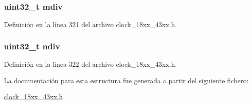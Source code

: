 \subsubsection[{\texorpdfstring{mdiv}{mdiv}}]{\setlength{\rightskip}{0pt plus 5cm}uint32\+\_\+t mdiv}\hypertarget{struct_c_g_u___u_s_b_a_u_d_i_o___p_l_l___s_e_t_u_p___t_ab8004496d39107a08ec9f804215bd2fb}{}\label{struct_c_g_u___u_s_b_a_u_d_i_o___p_l_l___s_e_t_u_p___t_ab8004496d39107a08ec9f804215bd2fb}


Definición en la línea 321 del archivo clock\+\_\+18xx\+\_\+43xx.\+h.

\subsubsection[{\texorpdfstring{ndiv}{ndiv}}]{\setlength{\rightskip}{0pt plus 5cm}uint32\+\_\+t ndiv}\hypertarget{struct_c_g_u___u_s_b_a_u_d_i_o___p_l_l___s_e_t_u_p___t_a6ab478553237b23124331747601b932e}{}\label{struct_c_g_u___u_s_b_a_u_d_i_o___p_l_l___s_e_t_u_p___t_a6ab478553237b23124331747601b932e}


Definición en la línea 322 del archivo clock\+\_\+18xx\+\_\+43xx.\+h.



La documentación para esta estructura fue generada a partir del siguiente fichero\+:\begin{DoxyCompactItemize}
\item 
\hyperlink{clock__18xx__43xx_8h}{clock\+\_\+18xx\+\_\+43xx.\+h}\end{DoxyCompactItemize}

